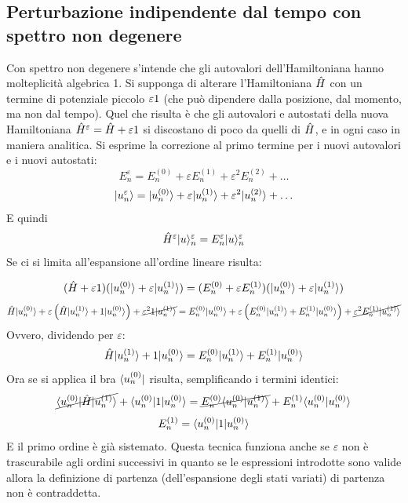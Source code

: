 \subsection{Perturbazione indipendente dal tempo con spettro non degenere}
Con spettro non degenere s'intende che gli autovalori dell'Hamiltoniana hanno molteplicità algebrica 1. Si supponga di alterare l'Hamiltoniana $\H$ con un termine di potenziale piccolo $\varepsilon \V$ (che può dipendere dalla posizione, dal momento, ma non dal tempo). Quel che risulta è che gli autovalori e autostati della nuova Hamiltoniana $\H^\varepsilon = \H + \varepsilon \V$ si discostano di poco da quelli di $\H$, e in ogni caso in maniera analitica. Si esprime la correzione al primo termine per i nuovi autovalori e i nuovi autostati:
\[
E_n^\varepsilon = E_n^{(0)} + \varepsilon E_n^{(1)} + \varepsilon^2 E_n^{(2)} + \ldots \]\[
\Ket {u_n^\varepsilon} = \Ket {u_n^{(0)}} + \varepsilon \Ket {u_n^{(1)}} + \varepsilon^2 \Ket {u_n^{(2)}} + \ldots
\]
E quindi
\[
	\H^\varepsilon \Ket u_n^\varepsilon = E_n^\varepsilon \Ket u_n^\varepsilon
\]
Se ci si limita all'espansione all'ordine lineare risulta:

\[
	(\H + \varepsilon \V)(\Ket {u_n^{(0)}} + \varepsilon \Ket {u_n^{(1)}}) = (E_n^{(0)} + \varepsilon E_n^{(1)})(\Ket {u_n^{(0)}} + \varepsilon \Ket {u_n^{(1)}}) \]\[
	\H\Ket {u_n^{(0)}} + \varepsilon \l \H \Ket {u_n^{(1)}} + \V \Ket {u_n^{(0)}} \r + \cancel{\varepsilon^2 \V \Ket {u_n^{(1)}}} = E_n^{(0)} \Ket {u_n^{(0)}} + \varepsilon \left( E_n^{(0)} \Ket {u_n^{(1)}} + E_n^{(1)} \Ket {u_n^{(0)}} \right) + \cancel{\varepsilon^2E_n^{(1)} \Ket {u_n^{(1)}}}
\]
Ovvero, dividendo per $\varepsilon$:
\[
	\H \Ket {u_n^{(1)}} + \V \Ket {u_n^{(0)}} = E_n^{(0)} \Ket {u_n^{(1)}} + E_n^{(1)} \Ket {u_n^{(0)}}
\]
Ora se si applica il bra $\Bra {u_n^{(0)}}$ risulta, semplificando i termini identici:
\[
	\cancel{\Bra {u_n^{(0)}}\H \Ket {u_n^{(1)}}} + \Bra {u_n^{(0)}} \V \Ket {u_n^{(0)}} = \cancel{E_n^{(0)} \braket {u_n^{(0)}}{u_n^{(1)}}} + E_n^{(1)} \braket {u_n^{(0)}}{u_n^{(0)}} \]\[
	E_n^{(1)} = \Bra{u_n^{(0)}} \V \Ket{u_n^{(0)}}
\]
E il primo ordine è già sistemato. Questa tecnica funziona anche se $\varepsilon$ non è trascurabile agli ordini successivi in quanto se le espressioni introdotte sono valide allora la definizione di partenza (dell'espansione degli stati variati) di partenza non è contraddetta.

